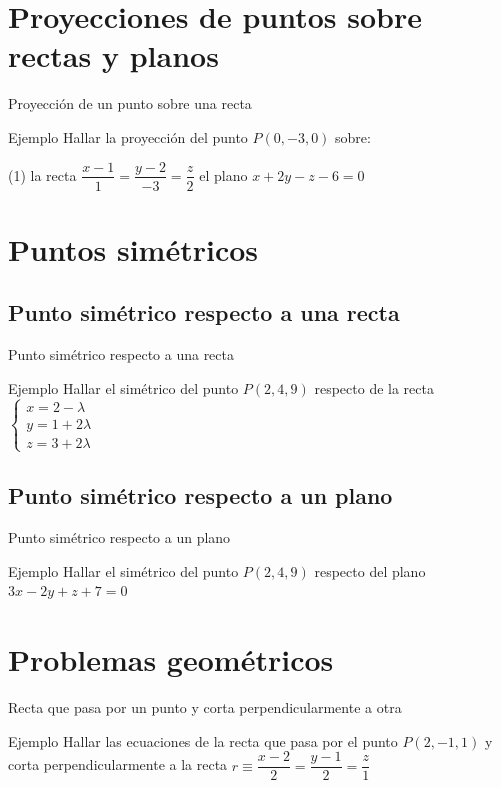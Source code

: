\documentclass[8pt]{beamer}
\begin{document}
\section{Proyecciones de puntos sobre rectas y planos}

\begin{frame}{Proyección de un punto sobre una recta}
\begin{exampleblock}{Ejemplo}
Hallar la proyección del punto $P(0,-3,0)$ sobre:
\begin{tasks}[label=\alph*)](1)
\task la recta $\dfrac{x-1}{1}=\dfrac{y-2}{-3}=\dfrac{z}{2}$
\task el plano $x+2y-z-6=0$
\end{tasks}
\end{exampleblock}
\end{frame}


\section{Puntos simétricos}


\subsection{Punto simétrico respecto a una recta}
\begin{frame}{Punto simétrico respecto a una recta}
\begin{exampleblock}{Ejemplo}
Hallar el simétrico del punto $P(2,4,9)$ respecto de la recta $\begin{cases} x= 2-\lambda \\ y = 1+2\lambda \\ z= 3+2\lambda \end{cases} $
\end{exampleblock}
\end{frame}

\subsection{Punto simétrico respecto a un plano}
\begin{frame}{Punto simétrico respecto a un plano}
\begin{exampleblock}{Ejemplo}
Hallar el simétrico del punto $P(2,4,9)$ respecto del plano $3x-2y+z+7=0$
\end{exampleblock}
\end{frame}


\section{Problemas geométricos}
\begin{frame}{Recta que pasa por un punto y corta perpendicularmente a otra}
\begin{exampleblock}{Ejemplo}
Hallar las ecuaciones de la recta que pasa por el punto $P(2,-1,1)$ y corta perpendicularmente a la recta $r \equiv \dfrac{x-2}{2}=\dfrac{y-1}{2}=\dfrac{z}{1}$
\end{exampleblock}
\end{frame}
\end{document}
